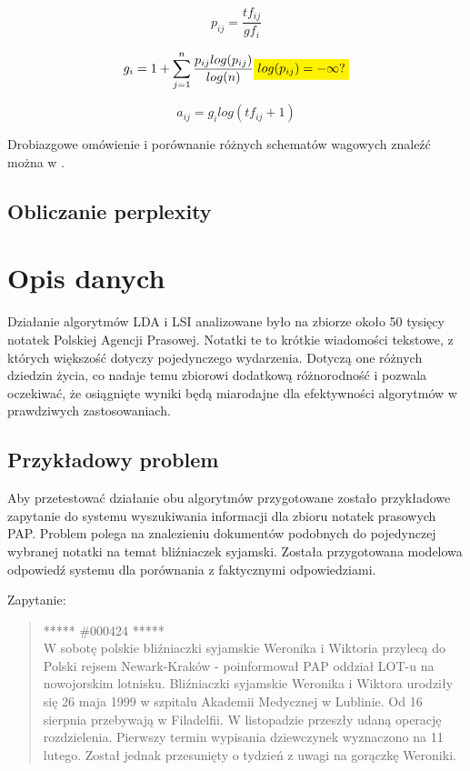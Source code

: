 \documentclass[11pt,a4paper]{article}
\newcommand{\todo}[1]{\colorbox{yellow}{#1}}
\begin{document}
\begin{equation}
  \label{eq:log-entr-beg}
  p_{ij} = \frac{tf_{ij}}{gf_i}
\end{equation}

\begin{equation}
  g_i = 1 + \sum_{j=1}^n \frac{p_{ij} log(p_{ij})}{log(n)}
  \todo{$log(p_{ij}) = -\infty?$}
\end{equation}

\begin{equation}
  \label{eq:log-entr-end}
  a_{ij} = g_i log(tf_{ij} + 1)
\end{equation}

Drobiazgowe omówienie i porównanie różnych schematów wagowych znaleźć moż\-na w
\cite{figiel}.

\subsection{Obliczanie perplexity}

\section{Opis danych}

Działanie algorytmów LDA i LSI analizowane było na zbiorze około 50 tysięcy
notatek Polskiej Agencji Prasowej. Notatki te to krótkie wiadomości tekstowe, z
których większość dotyczy pojedynczego wydarzenia. Dotyczą one różnych dziedzin
życia, co nadaje temu zbiorowi dodatkową różnorodność i pozwala oczekiwać, że
osiągnięte wyniki będą miarodajne dla efektywności algorytmów w prawdziwych
zastosowaniach.

\subsection{Przykładowy problem}
\label{sec:example}

Aby przetestować działanie obu algorytmów przygotowane zostało przykładowe
zapytanie do systemu wyszukiwania informacji dla zbioru notatek prasowych PAP.
Problem polega na znalezieniu dokumentów podobnych do pojedynczej wybranej
notatki na temat bliźniaczek syjamski. Została przygotowana modelowa odpowiedź
systemu dla porównania z faktycznymi odpowiedziami.

Zapytanie:

\begin{quote} ***** \#000424 *****\\ W sobotę polskie bliźniaczki syjamskie
Weronika i Wiktoria przylecą do Polski rejsem Newark-Kraków - poinformował PAP
oddział LOT-u na nowojorskim lotnisku.  Bliźniaczki syjamskie Weronika i
Wiktora urodziły się 26 maja 1999 w szpitalu Akademii Medycznej w Lublinie. Od
16 sierpnia przebywają w Filadelfii. W listopadzie przeszły udaną operację
rozdzielenia. Pierwszy termin wypisania dziewczynek wyznaczono na 11 lutego.
Został jednak przesunięty o tydzień z uwagi na gorączkę Weroniki.  \end{quote}
\end{document}
